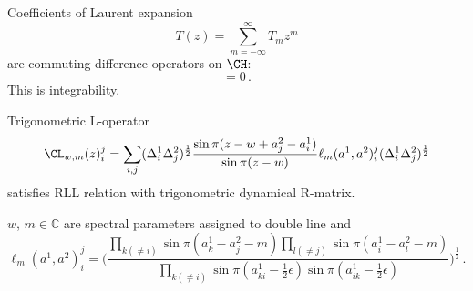 \documentclass[t]{beamer}
\newcommand{\C}{\mathbb{C}}
\let\eps\epsilon
\begin{document}
\begin{frame}
      


      





  Coefficients of Laurent expansion
  \begin{equation*}
    T(z) = \sum_{m=-\infty}^\infty T_m z^m
  \end{equation*}
  are commuting difference operators on $\CH$:
  \begin{equation*}
    [T_m, T_n] = 0 \,.
  \end{equation*}
  This is \alert{integrability}.
\end{frame}


\begin{frame}
  Trigonometric L-operator
  \begin{equation*}
    \CL_{w,m}(z)_i^j
    =
    \sum_{i,j}
    (\Delta^1_i \Delta^2_j)^{\frac12}
    \frac{\sin\pi(z - w + a^2_j - a^1_i)}{\sin\pi(z - w)}
    \ell_m(a^1, a^2)_i^j
    (\Delta^1_i \Delta^2_j)^{\frac12}
  \end{equation*}
  satisfies RLL relation with trigonometric dynamical R-matrix.

  $w$, $m \in \C$ are spectral parameters assigned to double line and
  \begin{equation*}
    \ell_m(a^1, a^2)_i^j
    =
    \Biggl(
    \frac{\prod_{k (\neq i)} \sin\pi(a^1_k - a^2_j - m)
      \prod_{l (\neq j)} \sin\pi(a^1_i - a^2_l - m)}
    {\prod_{k (\neq i)}\sin\pi(a^1_{ki} - \frac12\eps)
      \sin\pi(a^1_{ik} - \frac12\eps)}
    \Biggr)^{\frac12} \,.
  \end{equation*}
\end{frame}
\end{document}
